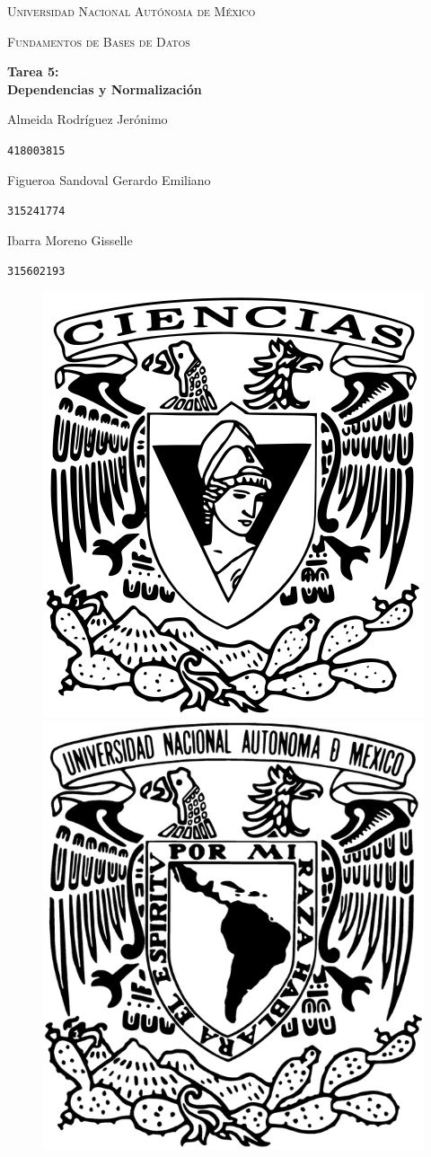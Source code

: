 \documentclass[a4paper, 12pt]{report}
\begin{document}
\begin{titlepage}
    \centering
    {\scshape\Huge Universidad Nacional Autónoma de México \par}
    \vspace{1.25cm}
    {\scshape\huge Fundamentos de Bases de Datos\par}
    \vspace{1.25cm}
    {\huge\bfseries Tarea 5:\\ Dependencias y Normalización\par}
    \vspace{1.25cm}
    {\Large\textsc Almeida Rodríguez Jerónimo\par}
    \vspace{.1cm}
    {\large\texttt{418003815}\par}
    \vspace{0.25cm}
    {\Large\textsc Figueroa Sandoval Gerardo Emiliano\par}
    \vspace{.1cm}
    {\large\texttt{315241774}\par}
    \vspace{0.25cm}
    {\Large\textsc Ibarra Moreno Gisselle \par}
    \vspace{.1cm}
    {\large\texttt{315602193}\par}
    \vspace{1.5cm}
    \vfill
    \begin{figure}[hb!]
        \includegraphics[width=.3\textwidth]
            {../logos/escudo_f-ciencias.png}\hfill
        \includegraphics[width=.3\textwidth]
            {../logos/Escudo_UNAM.png}\hfill
    \end{figure}
\end{titlepage}
\end{document}
